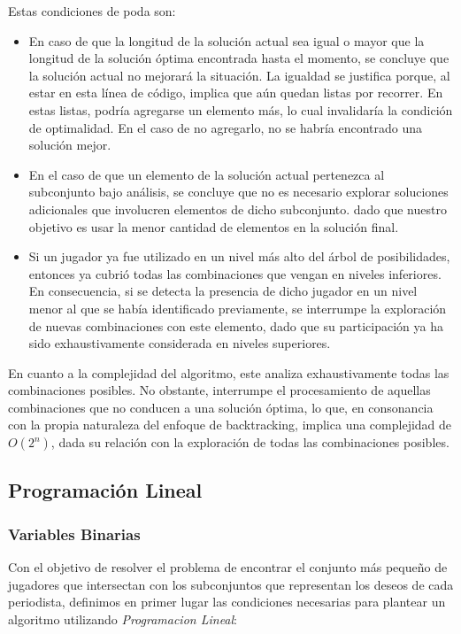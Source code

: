 Estas condiciones de poda son:
\begin{itemize}
	\item En caso de que la longitud de la solución actual sea igual o mayor que la longitud de la solución óptima encontrada hasta el momento, se concluye que la solución actual no mejorará la situación. La igualdad se justifica porque, al estar en esta línea de código, implica que aún quedan listas por recorrer. En estas listas, podría agregarse un elemento más, lo cual invalidaría la condición de optimalidad. En el caso de no agregarlo, no se habría encontrado una solución mejor.
	\item En el caso de que un elemento de la solución actual pertenezca al subconjunto bajo análisis, se concluye que no es necesario explorar soluciones adicionales que involucren elementos de dicho subconjunto. dado que nuestro objetivo es usar la menor cantidad de elementos en la solución final.
	\item Si un jugador ya fue utilizado en un nivel más alto del árbol de posibilidades, entonces ya cubrió todas las combinaciones que vengan en niveles inferiores. En consecuencia, si se detecta la presencia de dicho jugador en un nivel menor al que se había identificado previamente, se interrumpe la exploración de nuevas combinaciones con este elemento, dado que su participación ya ha sido exhaustivamente considerada en niveles superiores.
\end{itemize}

En cuanto a la complejidad del algoritmo, este analiza exhaustivamente todas las combinaciones posibles. No obstante, interrumpe el procesamiento de aquellas combinaciones que no conducen a una solución óptima, lo que, en consonancia con la propia naturaleza del enfoque de backtracking, implica una complejidad de ${O}(2^n)$, dada su relación con la exploración de todas las combinaciones posibles.

\subsection{Programación Lineal}

\subsubsection{Variables Binarias}

Con el objetivo de resolver el problema de encontrar el conjunto más pequeño de jugadores que intersectan con los subconjuntos que representan los deseos de cada periodista, definimos en primer lugar las condiciones necesarias para plantear un algoritmo utilizando \textit{Programacion Lineal}:

